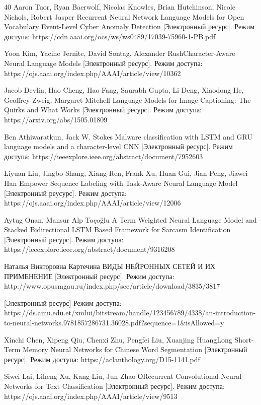 \documentclass{article}
\begin{document}
\begin{thebibliography} {40}
Aaron Tuor, Ryan Baerwolf, Nicolas Knowles, Brian Hutchinson, Nicole Nichols, Robert Jasper Recurrent Neural Network Language Models for Open Vocabulary Event-Level Cyber Anomaly Detection  [Электронный ресурс]. Режим доступа: https://cdn.aaai.org/ocs/ws/ws0489/17039-75960-1-PB.pdf

Yoon Kim, Yacine Jernite, David Sontag, Alexander RushCharacter-Aware Neural Language Models [Электронный ресурс].
Режим доступа: https://ojs.aaai.org/index.php/AAAI/article/view/10362

Jacob Devlin, Hao Cheng, Hao Fang, Saurabh Gupta, Li Deng, Xiaodong He, Geoffrey Zweig, Margaret Mitchell Language Models for Image Captioning: The Quirks and What Works [Электронный ресурс]. Режим доступа: https://arxiv.org/abs/1505.01809

Ben Athiwaratkun, Jack W. Stokes Malware classification with LSTM and GRU language models and a character-level CNN [Электронный ресурс]. Режим доступа: https://ieeexplore.ieee.org/abstract/document/7952603

Liyuan Liu, Jingbo Shang, Xiang Ren, Frank Xu, Huan Gui, Jian Peng, Jiawei Han Empower Sequence Labeling with Task-Aware Neural Language Model [Электронный реусурс]. Режим доступа: https://ojs.aaai.org/index.php/AAAI/article/view/12006

Aytug Onan, Mansur Alp Toçoğlu A Term Weighted Neural Language Model and Stacked Bidirectional LSTM Based Framework for Sarcasm Identification [Электронный ресурс]. Режим доступа: https://ieeexplore.ieee.org/abstract/document/9316208

Наталья Викторовна Картечина ВИДЫ НЕЙРОННЫХ СЕТЕЙ И ИХ ПРИМЕНЕНИЕ [Электронный ресурс]. Режим доступа: http://www.opusmgau.ru/index.php/see/article/download/3835/3817

 [Электронный ресурс] Режим доступа: https://ds.amu.edu.et/xmlui/bitstream/handle/123456789/4338/an-introduction-to-neural-networks.9781857286731.36028.pdf?sequence=1&isAllowed=y

Xinchi Chen, Xipeng Qiu, Chenxi Zhu, Pengfei Liu, Xuanjing HuangLong Short-Term Memory Neural Networks for Chinese Word Segmentation [Электронный ресурс].
Режим доступа: https://aclanthology.org/D15-1141.pdf

Siwei Lai, Liheng Xu, Kang Liu, Jun Zhao ОRecurrent Convolutional Neural Networks for Text Classification [Электронный ресурс].
Режим доступа: https://ojs.aaai.org/index.php/AAAI/article/view/9513


\end{thebibliography}
\end{document}
